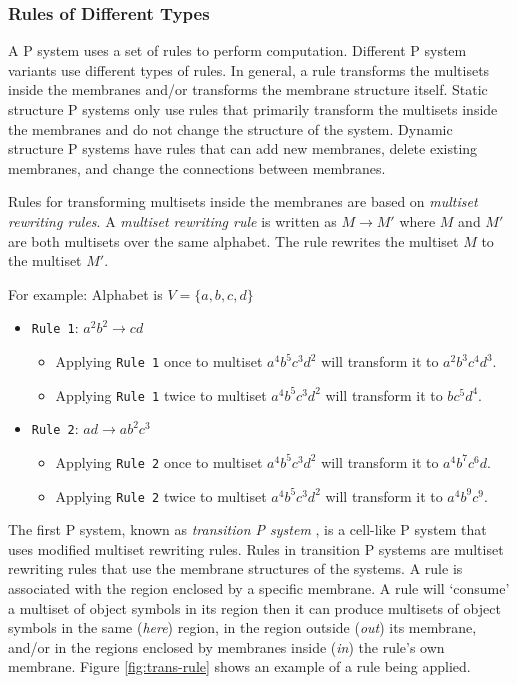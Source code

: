 \documentclass{article}
\begin{document}
\subsubsection{Rules of Different Types}\label{s-rule}

A P system uses a set of rules to perform computation. Different P system variants use different
types of rules. In general, a rule transforms the multisets inside the membranes and/or transforms
the membrane structure itself. Static structure P systems only use rules that primarily
transform the multisets inside the membranes and do not change the structure of the system. Dynamic
structure P systems have rules that can add new membranes, delete existing membranes, and change the
connections between membranes.

Rules for transforming multisets inside the membranes are based on \textit{multiset rewriting 
rules}. A \textit{multiset rewriting rule} is written as $M \rightarrow M'$ where $M$ and $M'$ are 
both multisets over the same alphabet. The rule rewrites the multiset $M$ to the multiset $M'$.

For example: Alphabet is $V = \{a,b,c,d\}$

\begin{itemize}

\item \texttt{Rule 1}: $a^2b^2 \rightarrow cd$
\begin{itemize}
\item Applying \texttt{Rule 1} once to multiset $a^4b^5c^3d^2$ will transform it to $a^2b^3c^4d^3$.
\item Applying \texttt{Rule 1} twice to multiset $a^4b^5c^3d^2$ will transform it to $bc^5d^4$.
\end{itemize}

\item \texttt{Rule 2}: $ad \rightarrow ab^2c^3$
\begin{itemize}
\item Applying \texttt{Rule 2} once to multiset $a^4b^5c^3d^2$ will transform it to $a^4b^7c^6d$.
\item Applying \texttt{Rule 2} twice to multiset $a^4b^5c^3d^2$ will transform it to $a^4b^9c^9$.
\end{itemize}

\end{itemize}

The first P system, known as \textit{transition P system} \cite{comp-w-mem}, is a cell-like P system
that uses modified multiset rewriting rules. Rules in transition P systems are multiset rewriting 
rules that use the membrane structures of the systems. A rule is associated with the region enclosed
by a specific membrane. A rule will `consume' a multiset of object symbols in its region then it can
produce multisets of object symbols in the same (\textit{here}) region, in the region outside 
(\textit{out}) its membrane, and/or in the regions enclosed by membranes inside (\textit{in}) the
rule's own membrane. Figure \ref{fig:trans-rule} shows an example of a rule being applied.
\end{document}
